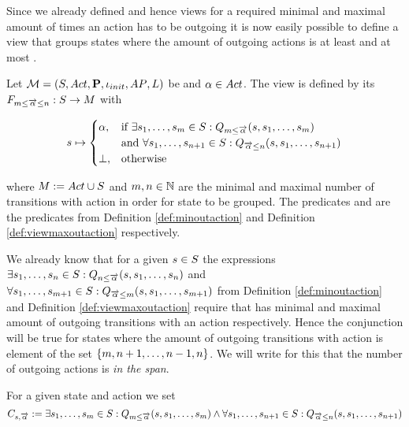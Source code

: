 \documentclass[preview]{standalone}
\begin{document}
Since we already defined \grpfctsN and hence views for a required minimal and maximal amount of times an action has to be outgoing it is now easily possible to define a view that groups states where the amount of outgoing actions is at least \numoutact and at most \numoutactb. 

\begin{definition}
	Let $\chgph = \chgphtuple$ be \chosengraphtypeN and $\action \in \actions$. The view 
	\viewspanoutaction is defined by its \grpfctN $\gfctspanoutaction : \states \to \arbset$ with
	
	\[
	\state \mapsto
	\begin{cases}
		\action,				& \text{if } \exists \state_1, \dots, \state_\numoutactb \in \states: \predminoutact[\numoutactb] \\ &\text{and } \forall \state_1, \dots, \state_{\numoutact+1} \in \states: \predmaxoutact \\
		\remelem,          	& \text{otherwise}
	\end{cases}
	\]
	
	where $\imggrp := \actions \cup \remset$ and $\numoutactb, \numoutact \in \natnums$ are the minimal and maximal number of transitions with action \action in order for state to be grouped. The predicates \predminoutact and \predmaxoutact are the predicates from Definition \ref{def:minoutaction} and Definition \ref{def:viewmaxoutaction} respectively.
\end{definition}

We already know that for a given $\state \in \states$ the expressions $\exists \state_1, \dots, \state_\numoutact \in \states: \predminoutact$ and $\forall \state_1, \dots, \state_{\numoutactb+1} \in \states: \predmaxoutact[\numoutactb]$ from Definition \ref{def:minoutaction} and Definition \ref{def:viewmaxoutaction} require that \state has minimal and maximal amount of outgoing transitions with an action \action respectively. Hence the conjunction will be true for states where the amount of outgoing transitions with action \action is element of the set $\{\numoutactb, \numoutact+1, \dots, \numoutact-1, \numoutact\}$. We will write for this that the number of outgoing actions is \emph{in the span}.

For a given state \state and action \action we set
\[
\formoutact:= \exists \state_1, \dots, \state_\numoutactb \in \states: \predminoutact[\numoutactb]\land \\
\forall \state_1, \dots, \state_{\numoutact+1} \in \states: \predmaxoutact
\]
\end{document}
